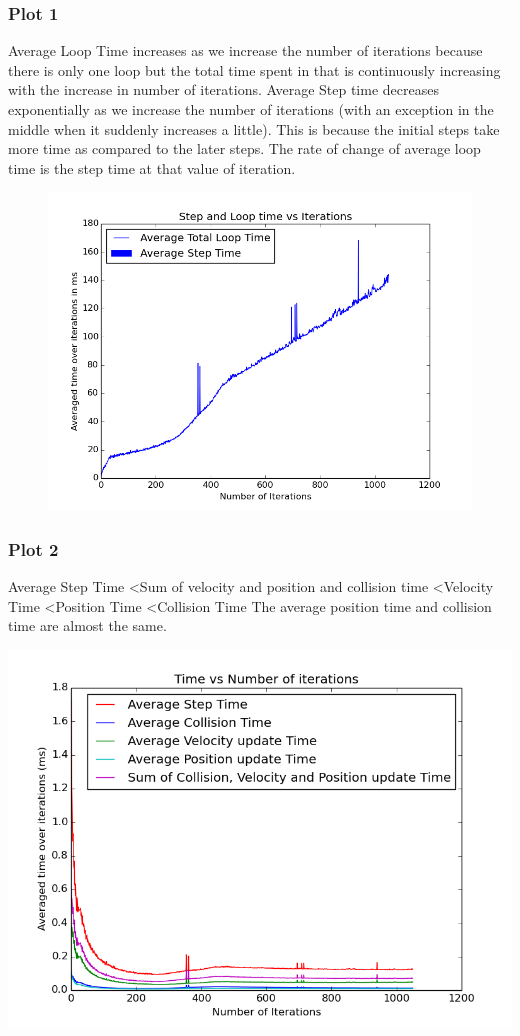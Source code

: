 \documentclass[11pt]{article}
\begin{document}
\subsubsection{Plot 1}
Average Loop Time increases as we increase the number of iterations because there is only one loop but the total time spent in that is continuously increasing with the increase in number of iterations.
Average Step time decreases exponentially as we increase the number of iterations (with an exception in the middle when it suddenly increases a little). This is because the initial steps take more time as compared to the later steps. The rate of change of average loop time is the step time at that value of iteration.\\
\begin{figure}
\includegraphics[scale=0.5]{../plots/g21_plot01.png}
\end{figure}
\subsubsection{Plot 2}
Average Step Time \textless Sum of velocity and position and collision time \textless  Velocity Time \textless  Position Time \textless Collision Time
The average position time and collision time are almost the same.\\
\begin{center}
\includegraphics[scale=0.5]{../plots/g21_plot02.png}
\end{center}
\end{document}
